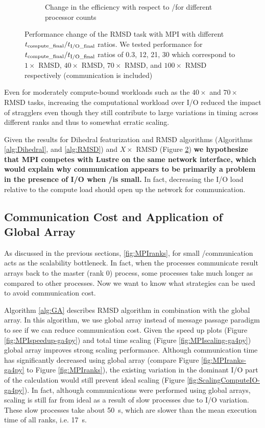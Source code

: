 \begin{figure}
\begin{subfigure}{.3\textwidth}
  \caption{Change in the efficiency with respect to \tcomp/\tIO for different processor counts}
  \label{fig:E_tcomp_tIO_effect}
\end{subfigure}
%
\caption{Performance change of the RMSD task with MPI with different ${t}_{\text{compute\_final}}/{t}_{\text{I/O\_final}}$ ratios. We tested performance for ${t}_{\text{compute\_final}}/{t}_{\text{I/O\_final}}$ ratios of 0.3, 12, 21, 30
which correspond to $1\times$ RMSD, $40\times$ RMSD, $70\times$ RMSD, and $100\times$ RMSD respectively (communication is included)}
\label{fig:tcomp_tIO_effect}
\end{figure}

Even for moderately compute-bound workloads such
as the $40\times$ and $70\times$ RMSD tasks, increasing the computational workload over I/O reduced the impact of stragglers even
though they still contribute to large variations in timing across different ranks and thus to somewhat erratic scaling. 

Given the results for Dihedral featurization and RMSD algorithms (Algorithms \ref{alg:Dihedral}, and \ref{alg:RMSD}) and $X\times$ RMSD (Figure \ref{fig:tcomp_tIO_effect})
\textbf{we hypothesize that MPI competes with Lustre on the same network interface, which would explain why communication appears to
  be primarily a problem in the presence of I/O when \tcomp/\tIO is small.}
In fact, decreasing the I/O load relative to the compute load should open up the network for communication. 

\subsection{Communication Cost and Application of Global Array}
\label{Global-Array}
As discussed in the previous sections, \ref{fig:MPIranks}, for small \tcomp/\tIO communication acts as the scalability bottleneck. 
In fact, when the processes communicate result arrays back to the master (rank 0) process, some processes take much longer as compared to other processes. 
Now we want to know what strategies can be used to avoid communication cost. 

Algorithm \ref{alg:GA} describes RMSD algorithm in combination with the global array.
In this algorithm, we use global array instead of message passage paradigm to see if we can reduce communication cost. 
Given the speed up plots (Figure \ref{fig:MPIspeedup-ga4py}) and total time scaling (Figure \ref{fig:MPIscaling-ga4py}) global array improves strong scaling performance.
Although communication time has significantly decreased using global array (compare Figure \ref{fig:MPIranks-ga4py} to Figure \ref{fig:MPIranks}),
the existing variation in the dominant I/O part of the calculation would still prevent ideal scaling (Figure \ref{fig:ScalingComputeIO-ga4py}).
In fact, although communications were performed using global arrays, scaling is still far from ideal as a result of slow processes due to I/O variation.
These slow processes take about 50~s, which are slower than the mean execution time of all ranks, i.e. 17~s. 

